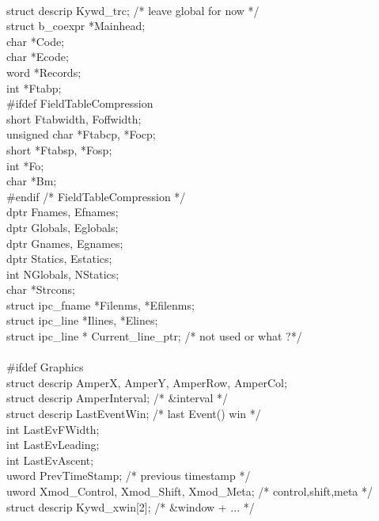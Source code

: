 \begin{iconcode}
\ \\
   struct descrip Kywd\_trc;         /* leave global for now   */ \\
   struct b\_coexpr *Mainhead; \\
   char *Code; \\
   char *Ecode; \\
   word *Records; \\
   int *Ftabp; \\
   \#ifdef FieldTableCompression \\
      short Ftabwidth, Foffwidth; \\
      unsigned char *Ftabcp, *Focp; \\
      short *Ftabsp, *Fosp; \\
      int *Fo; \\
      char *Bm; \\
   \#endif				/* FieldTableCompression */ \\
   dptr Fnames, Efnames; \\
   dptr Globals, Eglobals; \\
   dptr Gnames, Egnames; \\
   dptr Statics, Estatics; \\
   int NGlobals, NStatics; \\
   char *Strcons; \\
   struct ipc\_fname *Filenms, *Efilenms; \\
   struct ipc\_line *Ilines, *Elines; \\
  struct ipc\_line * Current\_line\_ptr;  /* not used or what ?*/ \\
\ \\
   \#ifdef Graphics \\
      struct descrip AmperX, AmperY, AmperRow, AmperCol; \\
      struct descrip AmperInterval;			/* \&interval */ \\
      struct descrip LastEventWin;			/* last Event() win */\\
      int LastEvFWidth; \\
      int LastEvLeading; \\
      int LastEvAscent; \\
      uword PrevTimeStamp;				/* previous timestamp */ \\
      uword Xmod\_Control, Xmod\_Shift, Xmod\_Meta;	/* control,shift,meta */ \\
      struct descrip Kywd\_xwin[2];			/* \&window + ... */\\
\ \\

\end{iconcode}
